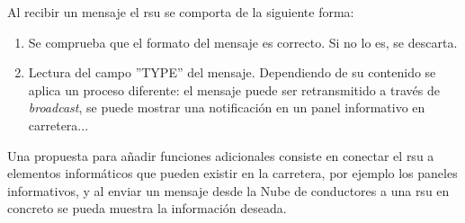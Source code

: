 Al recibir un mensaje el \gls{rsu} se comporta de la siguiente forma:
\begin{enumerate}
	\item Se comprueba que el formato del mensaje es correcto. Si no lo es, se
	descarta.

	\item Lectura del campo ''TYPE'' del mensaje. Dependiendo de su contenido
	se aplica 	un proceso diferente: el mensaje puede ser retransmitido a través
	de \emph{broadcast}, se puede mostrar una notificación en un panel
	informativo en carretera...
\end{enumerate}

Una propuesta para añadir funciones adicionales consiste en conectar el
\gls{rsu} a elementos informáticos que pueden existir en la carretera, por
ejemplo los paneles informativos, y al enviar un mensaje desde la Nube de
conductores a una \gls{rsu} en concreto se pueda muestra la información deseada.
